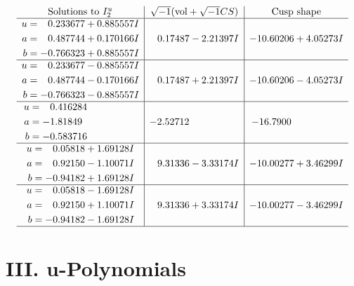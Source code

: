 \documentclass[1p]{elsarticle_modified}
\theoremstyle{definition}
\newcommand{\I}{\sqrt{-1}}
\begin{document}
$$\begin{array}{c|c|c}  
\text{Solutions to }I^u_{2}& \I (\text{vol} + \sqrt{-1}CS) & \text{Cusp shape}\\
 \hline 
\begin{aligned}
u &= \phantom{-}0.233677 + 0.885557 I \\
a &= \phantom{-}0.487744 + 0.170166 I \\
b &= -0.766323 + 0.885557 I\end{aligned}
 & \phantom{-}0.17487 - 2.21397 I & -10.60206 + 4.05273 I \\ \hline\begin{aligned}
u &= \phantom{-}0.233677 - 0.885557 I \\
a &= \phantom{-}0.487744 - 0.170166 I \\
b &= -0.766323 - 0.885557 I\end{aligned}
 & \phantom{-}0.17487 + 2.21397 I & -10.60206 - 4.05273 I \\ \hline\begin{aligned}
u &= \phantom{-}0.416284\phantom{ +0.000000I} \\
a &= -1.81849\phantom{ +0.000000I} \\
b &= -0.583716\phantom{ +0.000000I}\end{aligned}
 & -2.52712\phantom{ +0.000000I} & -16.7900\phantom{ +0.000000I} \\ \hline\begin{aligned}
u &= \phantom{-}0.05818 + 1.69128 I \\
a &= \phantom{-}0.92150 - 1.10071 I \\
b &= -0.94182 + 1.69128 I\end{aligned}
 & \phantom{-}9.31336 - 3.33174 I & -10.00277 + 3.46299 I \\ \hline\begin{aligned}
u &= \phantom{-}0.05818 - 1.69128 I \\
a &= \phantom{-}0.92150 + 1.10071 I \\
b &= -0.94182 - 1.69128 I\end{aligned}
 & \phantom{-}9.31336 + 3.33174 I & -10.00277 - 3.46299 I\\
 \hline 
 \end{array}$$\newpage
\newpage\renewcommand{\arraystretch}{1}
\centering \section*{ III. u-Polynomials}
\end{document}
